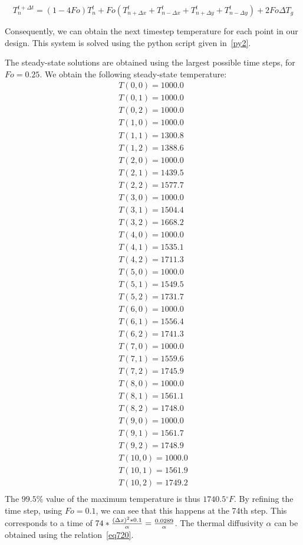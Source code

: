 \begin{equation}\label{eq718}
T_n^{t+\Delta t} = (1-4Fo)T_n^t + Fo(T_{n+\Delta x}^t + T_{n-\Delta x}^t + T_{n+\Delta y}^t + T_{n-\Delta y}^t) + 2Fo\Delta T_g
\end{equation}

Consequently, we can obtain the next timestep temperature for each point in our design. This system is solved using the python script given in~\ref{py2}.

The steady-state solutions are obtained using the largest possible time steps, for $Fo=0.25$. We obtain the following steady-state temperature:
\tiny
\begin{equation}\label{eq719}
\begin{aligned}
T(0,0) = 1000.0\\
T(0,1) = 1000.0\\
T(0,2) = 1000.0\\
T(1,0) = 1000.0\\
T(1,1) = 1300.8\\
T(1,2) = 1388.6\\
T(2,0) = 1000.0\\
T(2,1) = 1439.5\\
T(2,2) = 1577.7\\
T(3,0) = 1000.0\\
T(3,1) = 1504.4\\
T(3,2) = 1668.2\\
T(4,0) = 1000.0\\
T(4,1) = 1535.1\\
T(4,2) = 1711.3\\
T(5,0) = 1000.0\\
T(5,1) = 1549.5\\
T(5,2) = 1731.7\\
T(6,0) = 1000.0\\
T(6,1) = 1556.4\\
T(6,2) = 1741.3\\
T(7,0) = 1000.0\\
T(7,1) = 1559.6\\
T(7,2) = 1745.9\\
T(8,0) = 1000.0\\
T(8,1) = 1561.1\\
T(8,2) = 1748.0\\
T(9,0) = 1000.0\\
T(9,1) = 1561.7\\
T(9,2) = 1748.9\\
T(10,0) = 1000.0\\
T(10,1) = 1561.9\\
T(10,2) = 1749.2\\
\end{aligned}
\end{equation}
\normalsize
The $99.5\%$ value of the maximum temperature is thus $1740.5{}^\circ F$. By refining the time step, using $Fo=0.1$, we can see that this happens at the 74th step. This corresponds to a time of $74 * \frac{(\Delta x)^2 * 0.1}{\alpha} = \frac{\text{\num{0.0289}}}{\alpha}$. The thermal diffusivity $\alpha$ can be obtained using the relation~\ref{eq720}.

